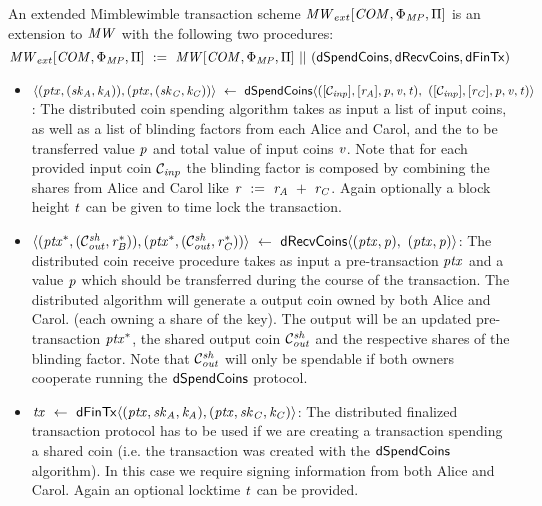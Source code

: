 \begin{definition}
    \label{def:ext-mw-tx-scheme}
    An extended Mimblewimble transaction scheme $\mathit{MW}_{ext}[\mathit{COM},\Phi_{\mathit{MP}},\Pi]$ is an extension to $\mathit{MW}$ with the following two procedures:
    \[ \mathit{MW}_{ext}[\mathit{COM},\Phi_{\mathit{MP}},\Pi] ~:=~ \mathit{MW}[\mathit{COM},\Phi_{\mathit{MP}},\Pi] ~||~ (\mathsf{dSpendCoins}, \mathsf{dRecvCoins}, \mathsf{dFinTx}) \]
    \begin{itemize}
        \item $\langle (\mathit{ptx},(\mathit{sk}_{\mathit{A}},\mathit{\mathit{k}_{\mathit{A}}})), (\mathit{ptx},(\mathit{sk}_{\mathit{C}},\mathit{\mathit{k}_{\mathit{C}}})) \rangle \\
        ~\leftarrow~ \mathsf{dSpendCoins} \langle ([\mathcal{C}_{\mathit{inp}}],[\mathit{r}_{\mathit{A}}],\mathit{p},\mathit{v},\mathit{t}) ,~ ([\mathcal{C}_{\mathit{inp}}],[\mathit{r}_{\mathit{C}}],\mathit{p},\mathit{v},\mathit{t}) \rangle$:
        The distributed coin spending algorithm takes as input a list of input coins, as well as a list of blinding factors from each Alice and Carol, and the to be transferred value $\mathit{p}$ and total value of input coins $\mathit{v}$.
        Note that for each provided input coin $\mathcal{C}_{\mathit{inp}}$ the blinding factor is composed by combining the shares from Alice and Carol like
        $\mathit{r} ~:=~ \mathit{r}_{\mathit{A}} ~+~ \mathit{r}_{\mathit{C}}$.
        Again optionally a block height $\mathit{t}$ can be given to time lock the transaction.
        \item $\langle (\mathit{ptx}^*, (\mathcal{C}_{\mathit{out}}^{\mathit{sh}}, \mathit{r}_{\mathit{B}}^*)), (\mathit{ptx}^*, (\mathcal{C}_{\mathit{out}}^{\mathit{sh}}, \mathit{r}_{\mathit{C}}^*)) \rangle ~\leftarrow~ \mathsf{dRecvCoins} \langle(\mathit{ptx},\mathit{p}) ,~ (\mathit{ptx},\mathit{p}) \rangle$: The distributed coin receive procedure takes as input a pre-transaction $\mathit{ptx}$ and a value $\mathit{p}$ which should be transferred during the course of the transaction.
        The distributed algorithm will generate a output coin owned by both Alice and Carol. (each owning a share of the key).
        The output will be an updated pre-transaction $\mathit{ptx}^*$, the shared output coin $\mathcal{C}_{\mathit{out}}^{\mathit{sh}}$ and the respective shares of the blinding factor.
        Note that $\mathcal{C}_{\mathit{out}}^{\mathit{sh}}$ will only be spendable if both owners cooperate running the $\mathsf{dSpendCoins}$ protocol.
        \item $\mathit{tx} ~\leftarrow~ \mathsf{dFinTx} \langle(\mathit{ptx},\mathit{sk}_{\mathit{A}},\mathit{\mathit{k}_{\mathit{A}}}),(\mathit{ptx},\mathit{sk}_{\mathit{C}},\mathit{\mathit{k}_{\mathit{C}}})\rangle$: The distributed finalized transaction protocol has to be used if we are creating a transaction spending a shared coin (i.e. the transaction was created with the $\mathsf{dSpendCoins}$ algorithm).
        In this case we require signing information from both Alice and Carol.
        Again an optional locktime $\mathit{t}$ can be provided.
    \end{itemize}
\end{definition}

